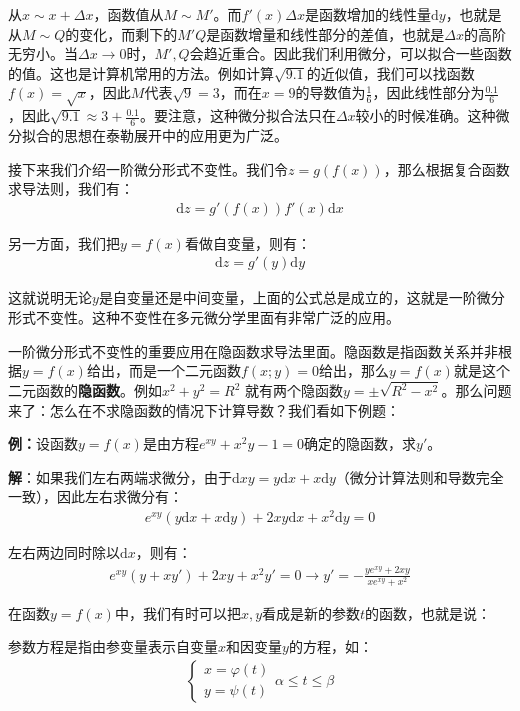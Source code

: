 \documentclass{ctexart}
\let\oldtextbf\textbf %
\renewcommand{\textbf}[1]{\textcolor{btex}{\oldtextbf{#1}}} %
\begin{document}
从$x\sim x+\Delta x$，函数值从$M\sim M'$。而$f'(x)\Delta x$是函数增加的线性量$\mathrm{d}y$，也就是从$M\sim Q$的变化，而剩下的$M'Q$是函数增量和线性部分的差值，也就是$\Delta x$的高阶无穷小。当$\Delta x\to 0$时，$M',Q$会趋近重合。因此我们利用微分，可以拟合一些函数的值。这也是计算机常用的方法。例如计算$\sqrt{9.1}$的近似值，我们可以找函数$f(x)=\sqrt{x}$，因此$M$代表$\sqrt{9}=3$，而在$x=9$的导数值为$\frac{1}{6}$，因此线性部分为$\frac{0.1}{6}$，因此$\sqrt{9.1}\approx 3+\frac{0.1}{6}$。要注意，这种微分拟合法只在$\Delta x$较小的时候准确。这种微分拟合的思想在泰勒展开中的应用更为广泛。

接下来我们介绍一阶微分形式不变性。我们令$z=g(f(x))$，那么根据复合函数求导法则，我们有：
\begin{align*}
    \mathrm{d}z=g'(f(x))f'(x)\mathrm{d}x
\end{align*}

另一方面，我们把$y=f(x)$看做自变量，则有：
\begin{align*}
    \mathrm{d}z=g'(y)\mathrm{d}y
\end{align*}

这就说明无论$y$是自变量还是中间变量，上面的公式总是成立的，这就是一阶微分形式不变性。这种不变性在多元微分学里面有非常广泛的应用。

一阶微分形式不变性的重要应用在隐函数求导法里面。隐函数是指函数关系并非根据$y=f(x)$给出，而是一个二元函数$f(x;y)=0$给出，那么$y=f(x)$就是这个二元函数的\textbf{隐函数}。例如$x^2+y^2=R^2$ 就有两个隐函数$y=\pm\sqrt{R^2-x^2}$。那么问题来了：怎么在不求隐函数的情况下计算导数？我们看如下例题：

\textbf{例：}设函数$y=f(x)$是由方程$e^{xy}+x^2y-1=0$确定的隐函数，求$y'$。

\textbf{解}：如果我们左右两端求微分，由于$\mathrm{d}xy=y\mathrm{d}x+x\mathrm{d}y$（微分计算法则和导数完全一致），因此左右求微分有：
\begin{align*}
    e^{xy}(y\mathrm{d}x+x\mathrm{d}y)+2xy\mathrm{d}x+x^2\mathrm{d}y=0
\end{align*}

左右两边同时除以$\mathrm{d}x$，则有：
\begin{align*}
    e^{xy}(y+xy')+2xy+x^2y'=0\to y'=-\frac{ye^{xy}+2xy}{xe^{xy}+x^2}
\end{align*}

在函数$y=f(x)$中，我们有时可以把$x,y$看成是新的参数$t$的函数，也就是说：
\begin{tcolorbox}[
    colback=bac1,     %
    colframe=fra1,   %
    coltitle=white,             %
    coltext=tex1,
    title=参数方程,
    fonttitle=\bfseries,        %
arc=3mm,                     %
breakable
]
参数方程是指由参变量表示自变量$x$和因变量$y$的方程，如：
\begin{align*}
    \begin{cases}
        x=\varphi(t)\\
        y=\psi(t)
    \end{cases}
    \alpha\leq t\leq \beta\tag{2-9}
\end{align*}
\end{tcolorbox}
\end{document}
